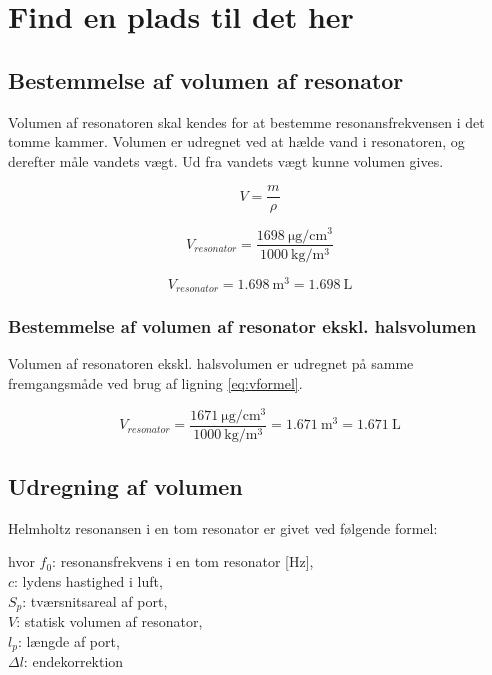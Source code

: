 \chapter{Find en plads til det her}

\section{Bestemmelse af volumen af resonator}

Volumen af resonatoren skal kendes for at bestemme resonansfrekvensen i det tomme kammer. Volumen er udregnet ved at hælde vand i resonatoren, og derefter måle vandets vægt. Ud fra vandets vægt kunne volumen gives. 

\begin{equation}
  V=\frac{m}{\rho}
  \label{eq:vformel}
\end{equation}

\begin{equation}
V_{resonator}=\frac{\SI{1698}{\micro\gram \per \centi\meter^{3}}}{\SI{1000}{\kilo \gram \per \meter^{3}}}
\end{equation}

\begin{equation}
	V_{resonator}={\SI{1.698}{\meter^{3}}}={\SI{1.698}{\liter}}
\end{equation}

\subsection{Bestemmelse af volumen af resonator ekskl. halsvolumen}

Volumen af resonatoren ekskl. halsvolumen er udregnet på samme fremgangsmåde ved brug af ligning \ref{eq:vformel}. 

\begin{equation}
V_{resonator}=\frac{\SI{1671}{\micro\gram \per \centi\meter^{3}}}{\SI{1000}{\kilo \gram \per \meter^{3}}}={\SI{1.671}{\meter^{3}}}={\SI{1.671}{\liter}}
\end{equation}

\section{Udregning af volumen}

Helmholtz resonansen i en tom resonator er givet ved følgende formel: \fnul

hvor $f_{0}$: resonansfrekvens i en tom resonator [Hz],\\
$c$: lydens hastighed i luft,\\
$S_{p}$: tværsnitsareal af port,\\
$V$: statisk volumen af resonator,\\
$l_{p}$: længde af port,\\
$\Delta l$: endekorrektion\\

